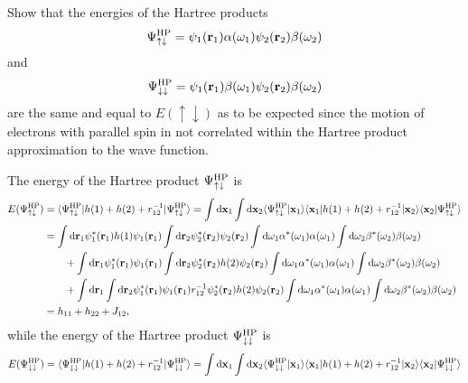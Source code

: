 \documentclass[a4paper]{book}
\newcounter{exercise}[chapter]
\newcounter{solution}[chapter]
\newcommand*{\dif}{\mathop{}\!\mathrm{d}}
\newcommand{\bfr}{{\bf r}}
\newcommand{\bfx}{{\bf x}}
\begin{document}
	\begin{exercise}
	Show that the energies of the Hartree products
	\[
		\Psi^{\rm HP}_{\uparrow\downarrow} = \psi_1(\bfr_1) \alpha(\omega_1) \psi_2(\bfr_2) \beta(\omega_2)
	\]
	and
	\[
		\Psi^{\rm HP}_{\downarrow\downarrow} = \psi_1(\bfr_1) \beta(\omega_1) \psi_2(\bfr_2) \beta(\omega_2)
	\]
	are the same and equal to $E(\uparrow\downarrow)$ as to be expected since the motion of electrons with parallel spin in not correlated within the Hartree product approximation to the wave function.
	\end{exercise}
	
	\begin{solution}
	
	The energy of the Hartree product $\Psi^{\rm HP}_{\uparrow\downarrow}$ is
	\begin{align*}
		E(\Psi^{\rm HP}_{\uparrow\downarrow}) &= \langle \Psi^{\rm HP}_{\uparrow\downarrow} | h(1) + h(2) + r^{-1}_{12} | \Psi^{\rm HP}_{\uparrow\downarrow} \rangle = \int \dif \bfx_1 \int \dif \bfx_2 \langle \Psi^{\rm HP}_{\uparrow\downarrow} | \bfx_1 \rangle \langle \bfx_1 | h(1) + h(2) + r^{-1}_{12} | \bfx_2 \rangle \langle \bfx_2 | \Psi^{\rm HP}_{\uparrow\downarrow} \rangle \\
		&= \int \dif \bfr_1 \psi^*_1(\bfr_1) h(1) \psi_1(\bfr_1) \int \dif \bfr_2 \psi^*_2(\bfr_2) \psi_2(\bfr_2) \int \dif \omega_1 \alpha^*(\omega_1) \alpha(\omega_1) \int \dif \omega_2 \beta^*(\omega_2) \beta(\omega_2) \\
		&\hspace{2em} + \int \dif \bfr_1 \psi^*_1(\bfr_1) \psi_1(\bfr_1) \int \dif \bfr_2 \psi^*_2(\bfr_2) h(2) \psi_2(\bfr_2) \int \dif \omega_1 \alpha^*(\omega_1) \alpha(\omega_1) \int \dif \omega_2 \beta^*(\omega_2) \beta(\omega_2) \\
		&\hspace{2em} + \int \dif \bfr_1 \int \dif \bfr_2 \psi^*_1(\bfr_1) \psi_1(\bfr_1) r^{-1}_{12} \psi^*_2(\bfr_2) h(2) \psi_2(\bfr_2) \int \dif \omega_1 \alpha^*(\omega_1) \alpha(\omega_1) \int \dif \omega_2 \beta^*(\omega_2) \beta(\omega_2) \\
		&= h_{11} + h_{22} + J_{12} ,
	\end{align*}
	while the energy of the Hartree product $\Psi^{\rm HP}_{\downarrow\downarrow}$ is
	\begin{align*}
		E(\Psi^{\rm HP}_{\downarrow\downarrow}) &= \langle \Psi^{\rm HP}_{\downarrow\downarrow} | h(1) + h(2) + r^{-1}_{12} | \Psi^{\rm HP}_{\downarrow\downarrow} \rangle = \int \dif \bfx_1 \int \dif \bfx_2 \langle \Psi^{\rm HP}_{\downarrow\downarrow} | \bfx_1 \rangle \langle \bfx_1 | h(1) + h(2) + r^{-1}_{12} | \bfx_2 \rangle \langle \bfx_2 | \Psi^{\rm HP}_{\downarrow\downarrow} \rangle \\

\end{align*}
\end{solution}
\end{document}
